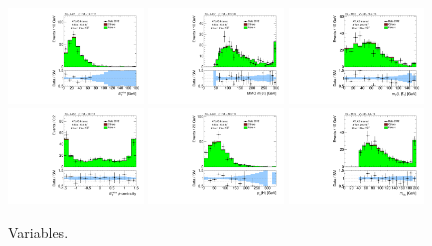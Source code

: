 \begin{figure}[tp]
  \includegraphics[width=0.32\textwidth]{figures/analysis/vbf-ZllCR/met-pt-hi}
  \includegraphics[width=0.32\textwidth]{figures/analysis/vbf-ZllCR/mMMC}
  \includegraphics[width=0.32\textwidth]{figures/analysis/vbf-ZllCR/mT-hi}
  \includegraphics[width=0.32\textwidth]{figures/analysis/vbf-ZllCR/met-phi-centrality}
  \includegraphics[width=0.32\textwidth]{figures/analysis/vbf-ZllCR/H-pt-hi}
  \includegraphics[width=0.32\textwidth]{figures/analysis/vbf-ZllCR/mvis}
  \caption{Variables.}
  \label{fig:backgrounds-ZllCR-taus}
\end{figure}

